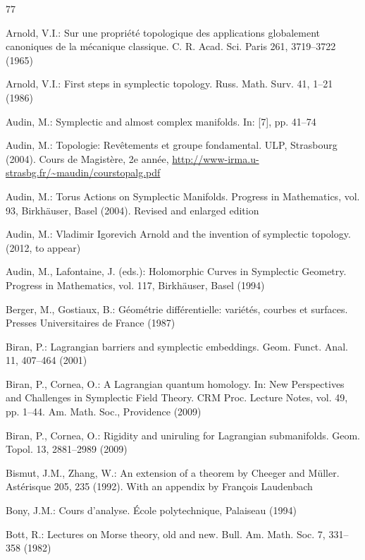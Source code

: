 \begin{thebibliography}{77}

 Arnold, V.I.: Sur une propriété topologique des applications globalement canoniques de la mécanique classique. C. R. Acad. Sci. Paris 261, 3719–3722 (1965)

 Arnold, V.I.: First steps in symplectic topology. Russ. Math. Surv. 41, 1–21 (1986)

 Audin, M.: Symplectic and almost complex manifolds. In: [7], pp. 41–74

 Audin, M.: Topologie: Revêtements et groupe fondamental. ULP, Strasbourg (2004). Cours de Magistère, 2e année, \url{http://www-irma.u-strasbg.fr/~maudin/courstopalg.pdf}

 Audin, M.: Torus Actions on Symplectic Manifolds. Progress in Mathematics, vol. 93, Birkhäuser, Basel (2004). Revised and enlarged edition

 Audin, M.: Vladimir Igorevich Arnold and the invention of symplectic topology. (2012, to appear)

 Audin, M., Lafontaine, J. (eds.): Holomorphic Curves in Symplectic Geometry. Progress in Mathematics, vol. 117, Birkhäuser, Basel (1994)

 Berger, M., Gostiaux, B.: Géométrie différentielle: variétés, courbes et surfaces. Presses Universitaires de France (1987)

 Biran, P.: Lagrangian barriers and symplectic embeddings. Geom. Funct. Anal. 11, 407–464 (2001)

 Biran, P., Cornea, O.: A Lagrangian quantum homology. In: New Perspectives and Challenges in Symplectic Field Theory. CRM Proc. Lecture Notes, vol. 49, pp. 1–44. Am. Math. Soc., Providence (2009)

 Biran, P., Cornea, O.: Rigidity and uniruling for Lagrangian submanifolds. Geom. Topol. 13, 2881–2989 (2009)

 Bismut, J.M., Zhang, W.: An extension of a theorem by Cheeger and Müller. Astérisque 205, 235 (1992). With an appendix by François Laudenbach

 Bony, J.M.: Cours d’analyse. École polytechnique, Palaiseau (1994)

 Bott, R.: Lectures on Morse theory, old and new. Bull. Am. Math. Soc. 7, 331–358 (1982)


\end{thebibliography}
